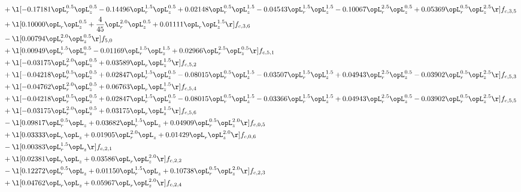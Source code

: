 \begin{alignat}{2}
& + \l[  -0.17181 \opL_r^{0.5} \opL_z^{0.5}   -0.14496 \opL_r^{1.5} \opL_z^{0.5} +  0.02148 \opL_r^{0.5} \opL_z^{1.5}   -0.04543 \opL_r^{1.5} \opL_z^{1.5}   -0.10067 \opL_r^{2.5} \opL_z^{0.5} +  0.05369 \opL_r^{0.5} \opL_z^{2.5}  \r] f_{c,3,5} \nonumber \\ 
& + \l[  0.10000 \opL_r \opL_z^{0.5} + \frac{4}{45} \opL_r^{2.0} \opL_z^{0.5} +  0.01111 \opL_r \opL_z^{1.5}  \r] f_{c,3,6} \nonumber \\ 
& - \l[  0.00794 \opL_r^{2.0} \opL_z^{0.5}  \r] f_{5,0} \nonumber \\ 
& + \l[  0.00949 \opL_r^{1.5} \opL_z^{0.5}   -0.01169 \opL_r^{1.5} \opL_z^{1.5} +  0.02966 \opL_r^{2.5} \opL_z^{0.5}  \r] f_{c,5,1} \nonumber \\ 
& + \l[  -0.03175 \opL_r^{2.0} \opL_z^{0.5} +  0.03589 \opL_r \opL_z^{1.5}  \r] f_{c,5,2} \nonumber \\ 
& + \l[  -0.04218 \opL_r^{0.5} \opL_z^{0.5} +  0.02847 \opL_r^{1.5} \opL_z^{0.5}   -0.08015 \opL_r^{0.5} \opL_z^{1.5}   -0.03507 \opL_r^{1.5} \opL_z^{1.5} +  0.04943 \opL_r^{2.5} \opL_z^{0.5}   -0.03902 \opL_r^{0.5} \opL_z^{2.5}  \r] f_{c,5,3} \nonumber \\ 
& + \l[  -0.04762 \opL_r^{2.0} \opL_z^{0.5} +  0.06763 \opL_r \opL_z^{1.5}  \r] f_{c,5,4} \nonumber \\ 
& + \l[  -0.04218 \opL_r^{0.5} \opL_z^{0.5} +  0.02847 \opL_r^{1.5} \opL_z^{0.5}   -0.08015 \opL_r^{0.5} \opL_z^{1.5}   -0.03366 \opL_r^{1.5} \opL_z^{1.5} +  0.04943 \opL_r^{2.5} \opL_z^{0.5}   -0.03902 \opL_r^{0.5} \opL_z^{2.5}  \r] f_{c,5,5} \nonumber \\ 
& + \l[  -0.03175 \opL_r^{2.0} \opL_z^{0.5} +  0.03175 \opL_r \opL_z^{1.5}  \r] f_{c,5,6} \nonumber \\ 
& - \l[  0.09817 \opL_r^{0.5} \opL_z +  0.03682 \opL_r^{1.5} \opL_z +  0.04909 \opL_r^{0.5} \opL_z^{2.0}  \r] f_{c,0,5} \nonumber \\ 
& + \l[  0.03333 \opL_r \opL_z +  0.01905 \opL_r^{2.0} \opL_z +  0.01429 \opL_r \opL_z^{2.0}  \r] f_{c,0,6} \nonumber \\ 
& - \l[  0.00383 \opL_r^{1.5} \opL_z  \r] f_{c,2,1} \nonumber \\ 
& + \l[  0.02381 \opL_r \opL_z +  0.03586 \opL_r \opL_z^{2.0}  \r] f_{c,2,2} \nonumber \\ 
& - \l[  0.12272 \opL_r^{0.5} \opL_z +  0.01150 \opL_r^{1.5} \opL_z +  0.10738 \opL_r^{0.5} \opL_z^{2.0}  \r] f_{c,2,3} \nonumber \\ 
& + \l[  0.04762 \opL_r \opL_z +  0.05967 \opL_r \opL_z^{2.0}  \r] f_{c,2,4} \nonumber \\ 

\end{alignat}
